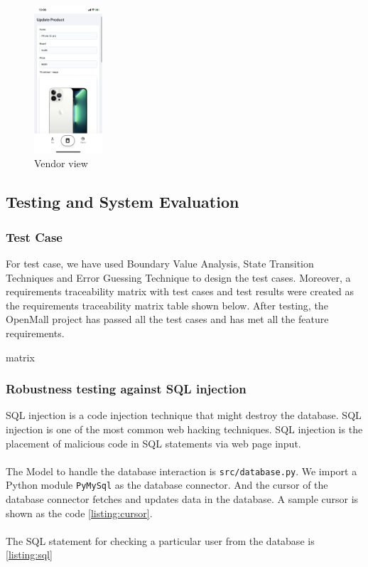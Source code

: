 \documentclass{article}
\begin{document}
\begin{figure}[htbp]
{\begin{minipage}[t]{0.25\linewidth}
\centering
\includegraphics[width=1in]{app update product.jpg}
\end{minipage}
}%
\centering
\caption{Vendor view}
\end{figure}

\subsection{Testing and System Evaluation}

\subsubsection{Test Case}
 
 For test case, we have used Boundary Value Analysis, State Transition Techniques and Error Guessing Technique to design the test cases. Moreover, a requirements traceability matrix with test cases and test results were created as the requirements traceability matrix table shown below. After testing, the OpenMall project has passed all the test cases and has met all the feature requirements.
 \newpage
 
 matrix
 \newpage

\subsubsection{Robustness testing against SQL injection}

SQL injection is a code injection technique that might destroy the database. SQL injection is one of the most common web hacking techniques. SQL injection is the placement of malicious code in SQL statements via web page input.
\\\\
The Model to handle the database interaction is \verb|src/database.py|. We import a Python module \verb|PyMySql| as the database connector. And the cursor of the database connector fetches and updates data in the database. A sample cursor is shown as the code \ref{listing:cursor}.
\\\\
The SQL statement for checking a particular user from the database is \ref{listing:sql}
\end{document}
